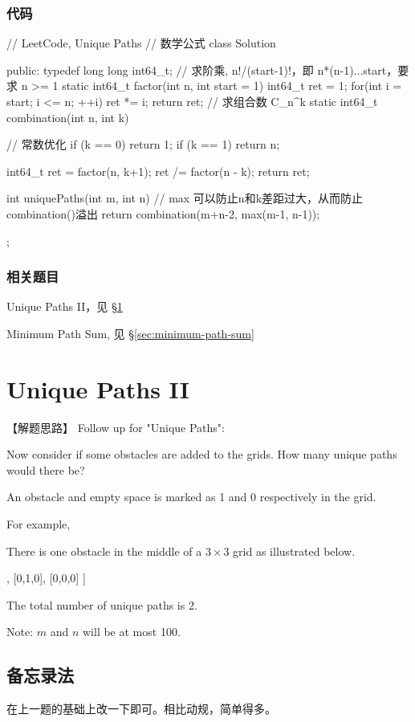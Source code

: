 \subsubsection{代码}
\begin{Code}
	// LeetCode, Unique Paths
	// 数学公式
	class Solution {
		public:
		typedef long long int64_t;
		// 求阶乘, n!/(start-1)!，即 n*(n-1)...start，要求 n >= 1
		static int64_t factor(int n, int start = 1) {
			int64_t  ret = 1;
			for(int i = start; i <= n; ++i)
			ret *= i;
			return ret;
		}
		// 求组合数 C_n^k
		static int64_t combination(int n, int k) {
			// 常数优化
			if (k == 0) return 1;
			if (k == 1) return n;
			
			int64_t ret = factor(n, k+1);
			ret /= factor(n - k);
			return ret;
		}
		
		int uniquePaths(int m, int n) {
			// max 可以防止n和k差距过大，从而防止combination()溢出
			return combination(m+n-2, max(m-1, n-1));
		}
	};
\end{Code}


\subsubsection{相关题目}
\begindot
\item Unique Paths II，见 \S \ref{sec:unique-paths-ii}
\item Minimum Path Sum, 见 \S \ref{sec:minimum-path-sum}
\myenddot


\section{Unique Paths II} %
\label{sec:unique-paths-ii}


【解题思路】
Follow up for "Unique Paths":

Now consider if some obstacles are added to the grids. How many unique paths would there be?

An obstacle and empty space is marked as 1 and 0 respectively in the grid.

For example,

There is one obstacle in the middle of a $3 \times 3$ grid as illustrated below.
\begin{Code}
	[
	[0,0,0],
	[0,1,0],
	[0,0,0]
	]
\end{Code}

The total number of unique paths is 2.

Note: $m$ and $n$ will be at most 100.


\subsection{备忘录法}
在上一题的基础上改一下即可。相比动规，简单得多。

